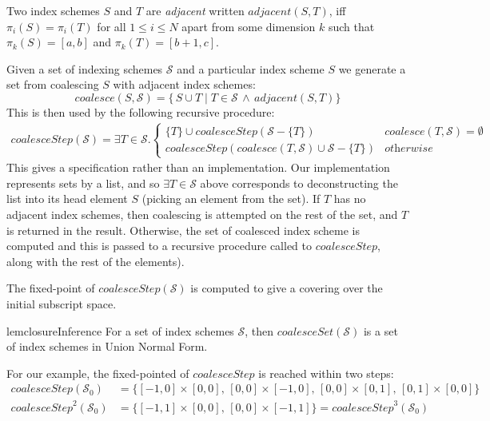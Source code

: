 \newcommand{\contig}[2]{\mathit{adjacent}(#1, #2)}
\begin{defn}[Adjacent]
  \label{def:contiguity}
  Two index schemes $S$ and $T$ are \emph{adjacent} written
  $\contig{S}{T}$, iff $\pi_i(S) = \pi_i(T)$ for all $1 \leq i \leq N$
  apart from some dimension $k$ such that $\pi_k(S) = [a, b]$ and
  $\pi_k(T) = [b+1, c]$.
\end{defn}
%
Given a set of indexing schemes $\mathcal{S}$ and a particular index scheme $S$
we generate a set from coalescing $S$ with adjacent index schemes:
%
\begin{equation*}
\mathit{coalesce}(S, \mathcal{S}) = 
  \{\,S \cup T \mid T \in \mathcal{S} \, \wedge \,
  \contig{S}{T} \}
\end{equation*}
%
This is then used by the following recursive procedure:
%
\begin{align*}
  \mathit{coalesceStep}(\mathcal{S}) =
  \exists T \in \mathcal{S} . 
  \begin{cases}
    \{T\} \cup \mathit{coalesceStep}(\mathcal{S} - \{T\}) &
    \mathit{coalesce}(T, \mathcal{S}) = \emptyset \\
    \mathit{coalesceStep}(\mathit{coalesce}(T, \mathcal{S}) \cup
                                        \mathcal{S} - \{T\}) & \textit{otherwise}
  \end{cases}
\end{align*}
%
This gives a specification rather than an implementation. Our
implementation represents sets by a list, and so
$\exists T \in \mathcal{S}$ above corresponds to deconstructing
the list into its head element $S$ (picking an element from the set).
If $T$ has no adjacent index schemes, then coalescing is attempted on
the rest of the set, and $T$ is returned in the result. Otherwise,
the set of coalesced index scheme is computed and this is passed to
a recursive procedure called to $\mathit{coalesceStep}$, along with the rest of
the elements).

The fixed-point of $\textit{coalesceStep}(\mathcal{S})$ is computed to
give a covering over the initial subscript space.
%
\begin{restatable}{lem}{closureInference}
  \label{lem:closuer-inference}
  For a set of index schemes $\mathcal{S}$, then
  $\mathit{coalesceSet}(\mathcal{S})$ is a set of
  index schemes in Union Normal Form.
\end{restatable}
%
For our example, the fixed-pointed of $\mathit{coalesceStep}$ is reached within two
steps:
%
\begin{align*}
  \mathit{coalesceStep}(\mathcal{S}_0) & =
  \{[-1,0] \times [0,0],\,[0,0] \times [-1, 0],\,[0,0] \times
    [0,1],\,[0,1] \times [0,0]\} \\
  \mathit{coalesceStep}^2(\mathcal{S}_0) & =
  \{[-1, 1] \times [0, 0],\,[0, 0] \times [-1, 1]\} = \mathit{coalesceStep}^3(\mathcal{S}_0)
\end{align*}
%

